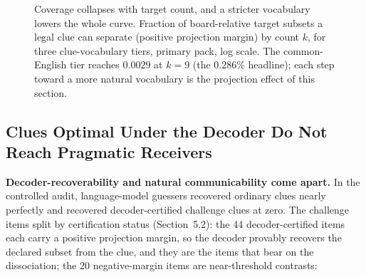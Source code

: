 \documentclass[11pt]{article}
\begin{document}
\begin{figure}[t]
\centering
{}
\caption{Coverage collapses with target count, and a stricter vocabulary lowers
the whole curve. Fraction of board-relative target subsets a legal clue can
separate (positive projection margin) by count $k$, for three clue-vocabulary
tiers, primary pack, log scale. The common-English tier reaches $0.0029$ at
$k=9$ (the $0.286\%$ headline); each step toward a more natural vocabulary is the
projection effect of this section.}
\label{fig:coverage}
\end{figure}

\subsection{Clues Optimal Under the Decoder Do Not Reach Pragmatic Receivers}

\textbf{Decoder-recoverability and natural communicability come apart.} In the
controlled audit, language-model guessers recovered ordinary clues nearly
perfectly and recovered decoder-certified challenge clues at zero. The challenge items split by
certification status (Section~5.2): the 44 decoder-certified items
each carry a positive projection margin, so the decoder provably recovers the
declared subset from the clue, and they are the items that bear on the
dissociation; the 20 negative-margin items are near-threshold contrasts:
\end{document}
